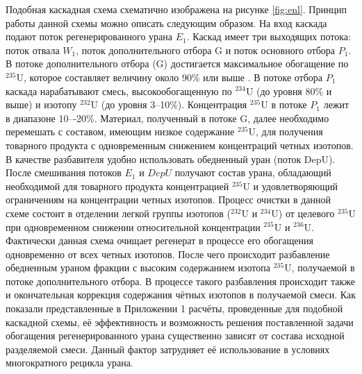 Подобная каскадная схема схематично изображена на рисунке \ref{fig:enl}. Принцип работы данной схемы можно описать следующим образом. На вход каскада подают поток регенерированного урана $E_1$. Каскад имеет три выходящих потока: поток отвала $W_1$, поток дополнительного отбора G и поток основного отбора $P_1$. В потоке дополнительного отбора (G) достигается максимальное обогащение по $^{235}$U, которое составляет величину около 90\% или выше \cite{palkinRestorationIsotopicComposition2020}. В потоке отбора $P_1$ каскада нарабатывают смесь, высокообогащенную по $^{234}$U (до уровня 80\% и выше) и изотопу $^{232}$U (до уровня 3--10\%). Концентрация $^{235}$U в потоке $P_1$ лежит в диапазоне 10–-20\%. Материал, полученный в потоке G, далее необходимо перемешать с составом, имеющим низкое содержание $^{235}$U, для получения товарного продукта с одновременным снижением концентраций четных изотопов. В качестве разбавителя удобно использовать обедненный уран (поток DepU). После смешивания потоков $E_1$ и $DepU$ получают состав урана, обладающий необходимой для товарного продукта концентрацией $^{235}$U и удовлетворяющий ограничениям на концентрации четных изотопов.
Процесс очистки в данной схеме состоит в отделении легкой группы изотопов ($^{232}$U и $^{234}$U) от целевого $^{235}$U при одновременном снижении относительной концентрации $^{235}$U и $^{236}$U. Фактически данная схема очищает регенерат в процессе его обогащения одновременно от всех четных изотопов. После чего происходит разбавление обедненным ураном фракции с высоким содержанием изотопа $^{235}$U, получаемой в потоке дополнительного отбора. В процессе такого разбавления происходит также и окончательная коррекция содержания чётных изотопов в получаемой смеси.
Как показали представленные в Приложении 1 расчёты, проведенные для подобной каскадной схемы, её эффективность и возможность решения поставленной задачи обогащения регенерированного урана существенно зависят от состава исходной разделяемой смеси. Данный фактор затрудняет её использование в условиях многократного рецикла урана. 

